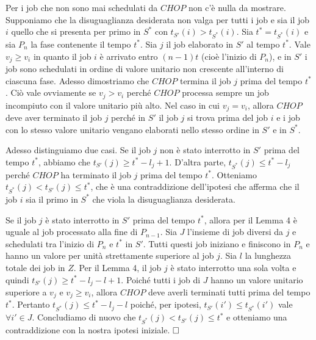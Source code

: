 \documentclass[12pt]{article}
\begin{document}
Per i job che non sono mai schedulati da $CHOP$ non c'è nulla da mostrare. Supponiamo che la disuguaglianza desiderata non valga per tutti i job e sia il job $i$ quello che si presenta per primo in $S^{*}$ con $t_{S'}(i) > t_{S^{*}}(i)$. Sia $t^{*} = t_{S^{*}}(i)$ e sia $P_{n}$ la fase contenente il tempo $t^{*}$. Sia $j$ il job elaborato in $S'$ al tempo $t^{*}$. Vale $v_{j} \geq v_{i}$ in quanto il job $i$ è arrivato entro $(n - 1)t$ (cioè l'inizio di $P_{n}$), e in $S'$ i job sono schedulati in ordine di valore unitario non crescente all'interno di ciascuna fase. Adesso dimostriamo che $CHOP$ termina il job $j$ prima del tempo $t^{*}$. Ciò vale ovviamente se $v_{j} > v_{i}$ perché $CHOP$ processa sempre un job incompiuto con il valore unitario più alto. Nel caso in cui $v_{j} = v_{i}$, allora $CHOP$ deve aver terminato il job $j$ perché in $S'$ il job $j$ si trova prima del job $i$ e i job con lo stesso valore unitario vengano elaborati nello stesso ordine in $S'$ e in $S^{*}$. 

Adesso distinguiamo due casi. Se il job $j$ non è stato interrotto in $S'$ prima del tempo $t^{*}$, abbiamo che $t_{S'}(j) \geq t^{*} - l_{j} + 1$. D'altra parte, $t_{S^{*}}(j) \leq t^{*} - l_{j}$ perché $CHOP$ ha terminato il job $j$ prima del tempo $t^{*}$. Otteniamo $t_{S^{*}}(j) < t_{S'}(j) \leq t^{*}$, che è una contraddizione dell'ipotesi che afferma che il job $i$ sia il primo in $S^{*}$ che viola la disuguaglianza desiderata. 

Se il job $j$ è stato interrotto in $S'$ prima del tempo $t^{*}$, allora per il Lemma 4 è uguale al job processato alla fine di $P_{n - 1}$. Sia $J$ l'insieme di job diversi da $j$ e schedulati tra l'inizio di $P_{n}$ e $t^{*}$ in $S'$. Tutti questi job iniziano e finiscono in $P_{n}$ e hanno un valore per unità strettamente superiore al job $j$. Sia $l$ la lunghezza totale dei job in $Z$. Per il Lemma 4, il job $j$ è stato interrotto una sola volta e quindi $t_{S'}(j) \geq t^{*} - l_{j} - l + 1$. Poiché tutti i job di $J$ hanno un valore unitario superiore a $v_{j}$ e $v_{j} \geq v_{i}$, allora $CHOP$ deve averli terminati tutti prima del tempo $t^{*}$. Pertanto $t_{S^{*}}(j) \leq t^{*} - l_{j} - l$ poiché, per ipotesi, $t_{S'}(i') \leq t_{S^{*}}(i')$ vale $\forall i' \in J$. Concludiamo di nuovo che $t_{S^{*}}(j) < t_{S'}(j) \leq t^{*}$ e otteniamo una contraddizione con la nostra ipotesi iniziale. $\hfill \square$
\newline
\end{document}
